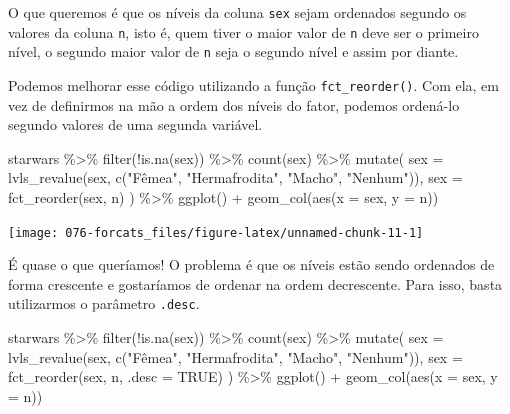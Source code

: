 \documentclass[
]{book}
\newenvironment{Shaded}{\begin{snugshade}}{\end{snugshade}}
\newcommand{\AttributeTok}[1]{\textcolor[rgb]{0.77,0.63,0.00}{#1}}
\newcommand{\ConstantTok}[1]{\textcolor[rgb]{0.00,0.00,0.00}{#1}}
\newcommand{\FunctionTok}[1]{\textcolor[rgb]{0.00,0.00,0.00}{#1}}
\newcommand{\NormalTok}[1]{#1}
\newcommand{\SpecialCharTok}[1]{\textcolor[rgb]{0.00,0.00,0.00}{#1}}
\newcommand{\StringTok}[1]{\textcolor[rgb]{0.31,0.60,0.02}{#1}}
\begin{document}
O que queremos é que os níveis da coluna \texttt{sex} sejam ordenados segundo os valores da coluna \texttt{n}, isto é, quem tiver o maior valor de \texttt{n} deve ser o primeiro nível, o segundo maior valor de \texttt{n} seja o segundo nível e assim por diante.

Podemos melhorar esse código utilizando a função \texttt{fct\_reorder()}. Com ela, em vez de definirmos na mão a ordem dos níveis do fator, podemos ordená-lo segundo valores de uma segunda variável.

\begin{Shaded}
\begin{Highlighting}[]
\NormalTok{starwars }\SpecialCharTok{\%\textgreater{}\%} 
  \FunctionTok{filter}\NormalTok{(}\SpecialCharTok{!}\FunctionTok{is.na}\NormalTok{(sex)) }\SpecialCharTok{\%\textgreater{}\%} 
  \FunctionTok{count}\NormalTok{(sex) }\SpecialCharTok{\%\textgreater{}\%} 
  \FunctionTok{mutate}\NormalTok{(}
    \AttributeTok{sex =} \FunctionTok{lvls\_revalue}\NormalTok{(sex, }\FunctionTok{c}\NormalTok{(}\StringTok{"Fêmea"}\NormalTok{, }\StringTok{"Hermafrodita"}\NormalTok{, }\StringTok{"Macho"}\NormalTok{, }\StringTok{"Nenhum"}\NormalTok{)),}
    \AttributeTok{sex =} \FunctionTok{fct\_reorder}\NormalTok{(sex, n)}
\NormalTok{  ) }\SpecialCharTok{\%\textgreater{}\%} 
  \FunctionTok{ggplot}\NormalTok{() }\SpecialCharTok{+}
  \FunctionTok{geom\_col}\NormalTok{(}\FunctionTok{aes}\NormalTok{(}\AttributeTok{x =}\NormalTok{ sex, }\AttributeTok{y =}\NormalTok{ n)) }
\end{Highlighting}
\end{Shaded}

\begin{center}\texttt{[image: 076-forcats\_files/figure-latex/unnamed-chunk-11-1]} \end{center}

É quase o que queríamos! O problema é que os níveis estão sendo ordenados de forma crescente e gostaríamos de ordenar na ordem decrescente. Para isso, basta utilizarmos o parâmetro \texttt{.desc}.

\begin{Shaded}
\begin{Highlighting}[]
\NormalTok{starwars }\SpecialCharTok{\%\textgreater{}\%} 
  \FunctionTok{filter}\NormalTok{(}\SpecialCharTok{!}\FunctionTok{is.na}\NormalTok{(sex)) }\SpecialCharTok{\%\textgreater{}\%} 
  \FunctionTok{count}\NormalTok{(sex) }\SpecialCharTok{\%\textgreater{}\%} 
  \FunctionTok{mutate}\NormalTok{(}
    \AttributeTok{sex =} \FunctionTok{lvls\_revalue}\NormalTok{(sex, }\FunctionTok{c}\NormalTok{(}\StringTok{"Fêmea"}\NormalTok{, }\StringTok{"Hermafrodita"}\NormalTok{, }\StringTok{"Macho"}\NormalTok{, }\StringTok{"Nenhum"}\NormalTok{)),}
    \AttributeTok{sex =} \FunctionTok{fct\_reorder}\NormalTok{(sex, n, }\AttributeTok{.desc =} \ConstantTok{TRUE}\NormalTok{)}
\NormalTok{  ) }\SpecialCharTok{\%\textgreater{}\%} 
  \FunctionTok{ggplot}\NormalTok{() }\SpecialCharTok{+}
  \FunctionTok{geom\_col}\NormalTok{(}\FunctionTok{aes}\NormalTok{(}\AttributeTok{x =}\NormalTok{ sex, }\AttributeTok{y =}\NormalTok{ n)) }
\end{Highlighting}
\end{Shaded}
\end{document}
